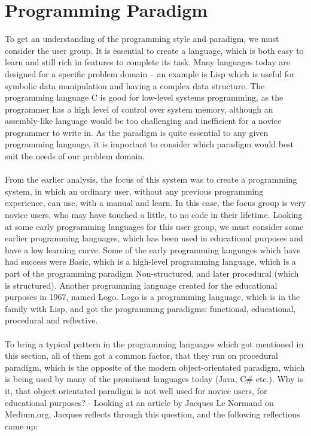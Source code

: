 
\section{Programming Paradigm}
\label{programmingparadigm}
To get an understanding of the programming style and paradigm, we must consider the user group. It is essential to create a language, which is both easy to learn and still rich in features to complete its task. Many languages today are designed for a specific problem domain – an example is Lisp which is useful for symbolic data manipulation and having a complex data structure. The programming language C is good for low-level systems programming, as the programmer has a high level of control over system memory, although an assembly-like language would be too challenging and inefficient for a novice programmer to write in.
As the paradigm is quite essential to any given programming language, it is important to consider which paradigm would best suit the needs of our problem domain.\\
\\
From the earlier analysis, the focus of this system was to create a programming system, in which an ordinary user, without any previous programming experience, can use, with a manual and learn. In this case, the focus group is very novice users, who may have touched a little, to no code in their lifetime. Looking at some early programming languages for this user group, we must consider some earlier programming languages, which has been used in educational purposes and have a low learning curve. Some of the early programming languages which have had success were Basic, which is a high-level programming language, which is a part of the programming paradigm Non-structured, and later procedural (which is structured). Another programming language created for the educational purposes in 1967, named Logo. Logo is a programming language, which is in the family with Lisp, and got the programming paradigms: functional, educational, procedural and reflective.\cite{scott2000programming} \\
\\
To bring a typical pattern in the programming languages which got mentioned in this section, all of them got a common factor, that they run on procedural paradigm, which is the opposite of the modern object-orientated paradigm, which is being used by many of the prominent languages today (Java, C\# etc.). Why is it, that object orientated paradigm is not well used for novice users, for educational purposes? - Looking at an article by Jacques Le Normand on Medium.org, Jacques reflects through this question, and the following reflections came up:\cite{tutlisp}\cite{medlisp} \\
